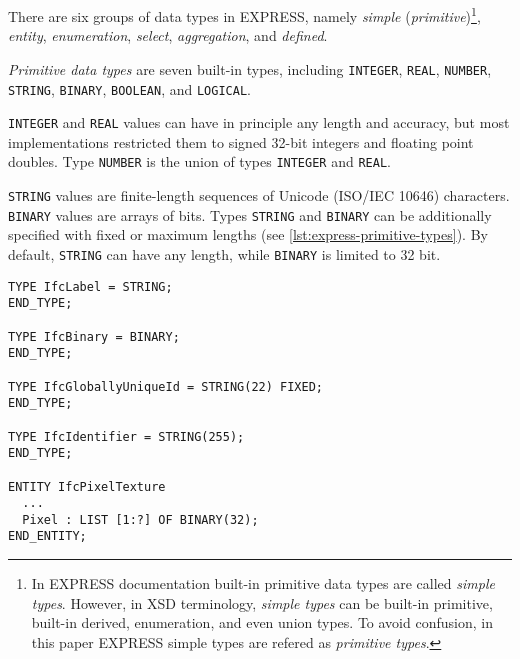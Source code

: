 
There are six groups of data types in EXPRESS, namely \emph{simple} (\emph{primitive})\footnote{
    In EXPRESS documentation built-in primitive data types are called \emph{simple types}.
    However, in XSD terminology, \emph{simple types} can be built-in primitive, built-in derived, enumeration, and even union types.
    To avoid confusion, in this paper EXPRESS simple types are refered as \emph{primitive types}.
}, \emph{entity}, \emph{enumeration}, \emph{select}, \emph{aggregation}, and \emph{defined}.

% 
% 
\emph{Primitive data types} are seven built-in types, including \texttt{IN\-TE\-GER}, \texttt{REAL}, \texttt{NUM\-BER}, \texttt{STRING}, \texttt{BI\-NA\-RY}, \texttt{BOOL\-EAN}, and \texttt{LOG\-I\-CAL}.

\texttt{INTEGER} and \texttt{REAL} values can have in principle any length and accuracy, but most implementations restricted them to signed 32-bit integers
and floating point doubles.
Type \texttt{NUM\-BER} is the union of types \texttt{IN\-TE\-GER} and \texttt{REAL}.

\texttt{STRING} values are finite-length sequences of Unicode (ISO/IEC 10646) characters.
\texttt{BINARY} values are arrays of bits.
Types \texttt{STRING} and \texttt{BINARY} can be additionally specified with fixed or maximum lengths (see \autoref{lst:express-primitive-types}).
By default, \texttt{STRING} can have any length, while \texttt{BINARY} is limited to 32 bit.


\begin{lstlisting}[caption={Examples of \texttt{STRING} and \texttt{BINARY} types with default, fixed, and maximum lengths.},label=lst:express-primitive-types]
TYPE IfcLabel = STRING;
END_TYPE;

TYPE IfcBinary = BINARY;
END_TYPE;

TYPE IfcGloballyUniqueId = STRING(22) FIXED;
END_TYPE;

TYPE IfcIdentifier = STRING(255);
END_TYPE;

ENTITY IfcPixelTexture
  ...
  Pixel : LIST [1:?] OF BINARY(32);
END_ENTITY;
\end{lstlisting}



